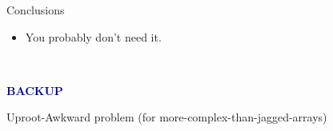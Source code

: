 \documentclass[aspectratio=169]{beamer}
\begin{document}
\begin{frame}{Conclusions}
\large
\begin{itemize}
\item<2-> You probably don't need it.
\end{itemize}
\end{frame}

\begin{frame}{\mbox{ }}
\Huge
\begin{center}
\textcolor{darkblue}{\bf BACKUP}
\end{center}
\end{frame}

\begin{frame}{Uproot-Awkward problem (for more-complex-than-jagged-arrays)}
\vspace{0.25 cm}
\end{frame}
\end{document}
